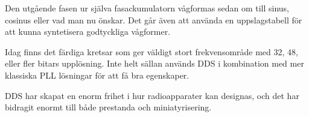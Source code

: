 Den utgående fasen ur själva fasackumulatorn vågformas sedan om till sinus,
cosinus eller vad man nu önskar.
Det går även att använda en uppslagstabell för att kunna syntetisera godtyckliga
vågformer.

Idag finns det färdiga kretsar som ger väldigt stort frekvensområde med 32, 48,
eller fler bitars upplösning.
Inte helt sällan används DDS i kombination med mer klassiska PLL lösningar
för att få bra egenskaper.

DDS har skapat en enorm frihet i hur radioapparater kan designas, och det har
bidragit enormt till både prestanda och miniatyrisering.
